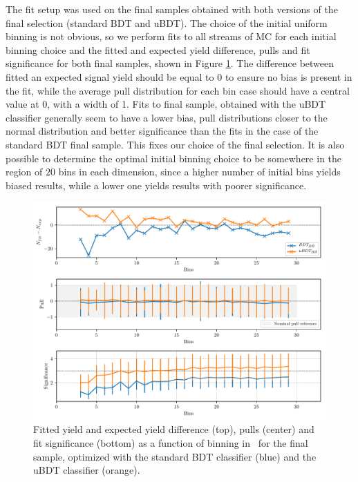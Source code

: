 The fit setup was used on the final samples obtained with both versions of the final selection (standard BDT and uBDT). The choice of the initial uniform binning is not obvious, so we perform fits to all streams of MC for each initial binning choice and the fitted and expected yield difference, pulls and fit significance for both final samples, shown in Figure \ref{fig:sig_binning}. The difference between fitted an expected signal yield should be equal to 0 to ensure no bias is present in the fit, while the average pull distribution for each bin case should have a central value at 0, with a width of 1. Fits to final sample, obtained with the uBDT classifier generally seem to have a lower bias, pull distributions closer to the normal distribution and better significance than the fits in the case of the standard BDT final sample. This fixes our choice of the final selection. It is also possible to determine the optimal initial binning choice to be somewhere in the region of $20$ bins in each dimension, since a higher number of initial bins yields biased results, while a lower one yields results with poorer significance.

\begin{figure}[H]
	\centering
	\captionsetup{width=0.8\linewidth}
	\includegraphics[width=\linewidth]{fig/sig_binning}
	\caption{Fitted yield and expected yield difference (top), pulls (center) and fit significance (bottom) as a function of binning in \vars~for the final sample, optimized with the standard BDT classifier (blue) and the uBDT classifier (orange).}
	\label{fig:sig_binning}
\end{figure}

